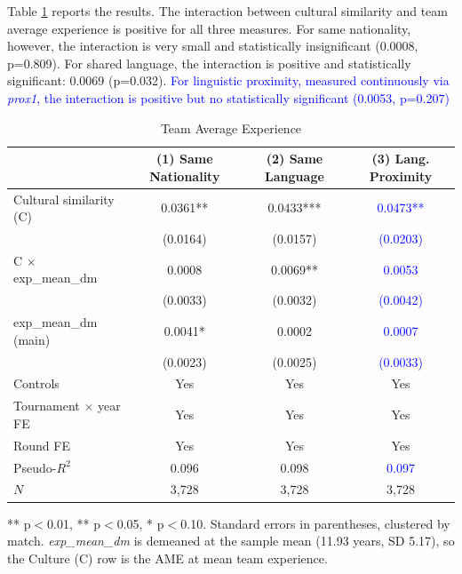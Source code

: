 \documentclass[10pt]{article}
\begin{document}

Table \ref{tab:t6} reports the results. The interaction between cultural similarity and team average experience is positive for all three measures. For same nationality, however, the interaction is very small and statistically insignificant (0.0008, p=0.809). For shared language, the interaction is positive and statistically significant: 0.0069 (p=0.032). \textcolor{blue}{For linguistic proximity, measured continuously via \textit{prox1}, the interaction is positive but no statistically significant (0.0053, p=0.207)}


\begin{table}[htbp]
\color{red}
\centering
\caption{Team Average Experience \label{tab:t6}}
\begin{threeparttable}
\begin{tabular}{lccc}
\toprule
 & (1) Same Nationality & (2) Same Language & (3) Lang. Proximity \\
\midrule
Cultural similarity (C)  & 0.0361** & 0.0433*** & \textcolor{blue}{0.0473**} \\
 & (0.0164) & (0.0157) & \textcolor{blue}{(0.0203)} \\
C $\times$ exp\_mean\_dm & 0.0008 & 0.0069** & \textcolor{blue}{0.0053} \\
 & (0.0033) & (0.0032) & \textcolor{blue}{(0.0042)} \\
exp\_mean\_dm (main) & 0.0041* & 0.0002 & \textcolor{blue}{0.0007} \\
 & (0.0023) & (0.0025) & \textcolor{blue}{(0.0033)} \\
\midrule
Controls & Yes & Yes & Yes \\
Tournament $\times$ year FE & Yes & Yes & Yes \\
Round FE & Yes & Yes & Yes \\
Pseudo-$R^2$ & 0.096 & 0.098 & \textcolor{blue}{0.097} \\
$N$ & 3,728 & 3,728 & 3,728 \\
\bottomrule
\end{tabular}
\begin{tablenotes}
\small
\item *** p$<$0.01, ** p$<$0.05, * p$<$0.10. Standard errors in parentheses, clustered by match. \textit{exp\_mean\_dm} is demeaned at the sample mean (11.93 years, SD 5.17), so the Culture (C) row is the AME at mean team experience.
\end{tablenotes}
\end{threeparttable}
\end{table}
\FloatBarrier
\end{document}

